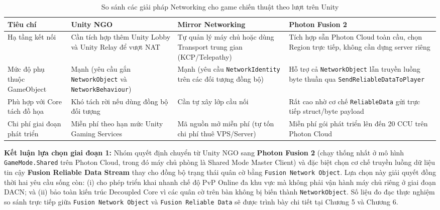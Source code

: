 \begin{table}[H]
    \centering
    \caption{So sánh các giải pháp Networking cho game chiến thuật theo lượt trên Unity}
    \label{tab:net_solutions}
    \begin{tabularx}{\textwidth}{|L{2.5cm}|Y|Y|Y|}
        \hline
        \textbf{Tiêu chí} & \textbf{Unity NGO} & \textbf{Mirror Networking} & \textbf{Photon Fusion 2} \\
        \hline
        Hạ tầng kết nối & Cần tích hợp thêm Unity Lobby và Unity Relay để vượt NAT & Tự quản lý máy chủ hoặc dùng Transport trung gian (KCP/Telepathy) & Tích hợp sẵn Photon Cloud toàn cầu, chọn Region trực tiếp, không cần dựng server riêng \\
        \hline
        Mức độ phụ thuộc GameObject & Mạnh (yêu cầu gắn \texttt{NetworkObject} và \texttt{NetworkBehaviour}) & Mạnh (yêu cầu \texttt{NetworkIdentity} trên các đối tượng đồng bộ) & Hỗ trợ cả \texttt{NetworkObject} lẫn truyền luồng byte thuần qua \texttt{SendReliableDataToPlayer} \\
        \hline
        Phù hợp với Core tách đồ họa & Khó tách rời nếu dùng đồng bộ đối tượng & Cần tự xây lớp cầu nối & Rất cao nhờ cơ chế \texttt{ReliableData} gửi trực tiếp struct/byte payload \\
        \hline
        Chi phí giai đoạn phát triển & Miễn phí theo hạn mức Unity Gaming Services & Mã nguồn mở miễn phí (tự tốn chi phí thuê VPS/Server) & Miễn phí gói phát triển lên đến 20 CCU trên Photon Cloud \\
        \hline
    \end{tabularx}
\end{table}

\textbf{Kết luận lựa chọn giai đoạn 1:} Nhóm quyết định chuyển từ Unity NGO sang \textbf{Photon Fusion 2} \cite{photon_fusion} (chạy thống nhất ở mô hình \texttt{GameMode.Shared} trên Photon Cloud, trong đó máy chủ phòng là Shared Mode Master Client) và đặc biệt chọn cơ chế truyền luồng dữ liệu tin cậy \textbf{Fusion Reliable Data Stream} thay cho đồng bộ trạng thái quân cờ bằng \texttt{Fusion Network Object}. Lựa chọn này giải quyết đồng thời hai yêu cầu sống còn: (i) cho phép triển khai nhanh chế độ PvP Online đa khu vực mà không phải vận hành máy chủ riêng ở giai đoạn DACN; và (ii) bảo toàn kiến trúc Decoupled Core vì các quân cờ trên bàn không bị biến thành \texttt{NetworkObject}. Số liệu đo đạc thực nghiệm so sánh trực tiếp giữa \texttt{Fusion Network Object} và \texttt{Fusion Reliable Data} sẽ được trình bày chi tiết tại Chương 5 và Chương 6.

